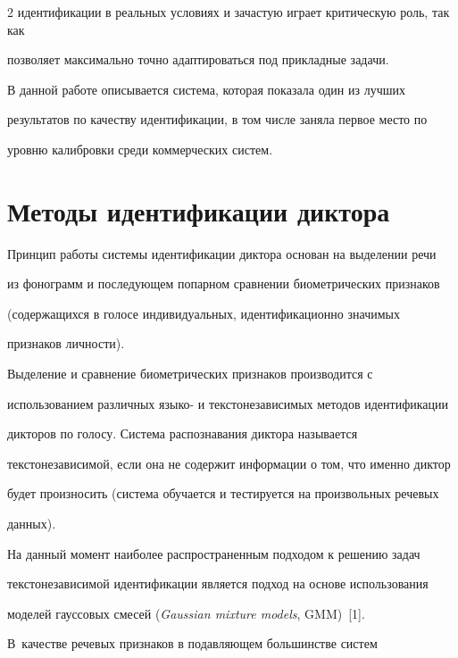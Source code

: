\begin{multicols}{2}
идентификации в реальных условиях и зачастую играет критическую роль, так как 


позволяет максимально точно адаптироваться под прикладные задачи.


  


  В данной работе описывается система, которая показала один из лучших 


результатов по качеству идентификации, в том числе заняла первое место по 


уровню калибровки среди коммерческих систем.


  


\section{Методы идентификации диктора}





  Принцип работы системы идентификации диктора основан на выделении речи 


из фонограмм и последующем попарном сравнении биометрических признаков 


(содержащихся в голосе индивидуальных, идентификационно значимых 


признаков личности). 


  


  Выделение и сравнение биометрических признаков производится с 


использованием различных язы\-ко- и текстонезависимых методов идентификации 


дикторов по голосу. Система распознавания диктора называется 


текстонезависимой, если она не содержит информации о том, что именно диктор 


будет произносить (система обучается и тестируется на произвольных речевых 


данных).


  


  На данный момент наиболее распространенным подходом к решению задач 


текстонезависимой идентификации является подход на основе использования 


моделей гауссовых смесей (\textit{Gaussian mixture models}, GMM)~[1]. 


В~качестве речевых признаков в подавляющем большинстве систем 



\end{multicols}
